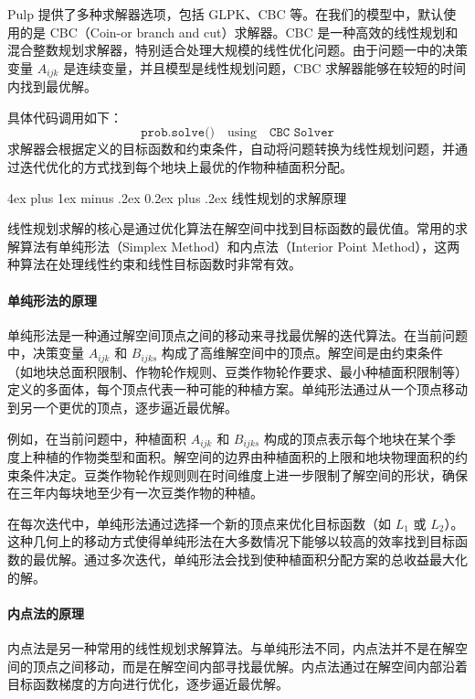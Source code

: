 \documentclass[12pt,a4paper]{nmmcm}
\makeatletter
\renewcommand\subsubsection{\@startsection{subsubsection}{3}{1em}%
  {4ex plus 1ex minus .2ex}%
  {0.2ex plus .2ex}%
  {\normalfont\large\bfseries}}
\makeatother
\begin{document}
Pulp 提供了多种求解器选项，包括 GLPK、CBC 等。在我们的模型中，默认使用的是 CBC（Coin-or branch and cut）求解器。CBC 是一种高效的线性规划和混合整数规划求解器，特别适合处理大规模的线性优化问题。由于问题一中的决策变量 $A_{ijk}$ 是连续变量，并且模型是线性规划问题，CBC 求解器能够在较短的时间内找到最优解。

具体代码调用如下：
\[
  \texttt{prob.solve()} \quad \text{using} \quad \texttt{CBC Solver}
\]
求解器会根据定义的目标函数和约束条件，自动将问题转换为线性规划问题，并通过迭代优化的方式找到每个地块上最优的作物种植面积分配。

\subsubsection{线性规划的求解原理}

线性规划求解的核心是通过优化算法在解空间中找到目标函数的最优值。常用的求解算法有单纯形法（Simplex Method）和内点法（Interior Point Method），这两种算法在处理线性约束和线性目标函数时非常有效。

\paragraph{单纯形法的原理}

单纯形法是一种通过解空间顶点之间的移动来寻找最优解的迭代算法。在当前问题中，决策变量 $A_{ijk}$ 和 $B_{ijks}$ 构成了高维解空间中的顶点。解空间是由约束条件（如地块总面积限制、作物轮作规则、豆类作物轮作要求、最小种植面积限制等）定义的多面体，每个顶点代表一种可能的种植方案。单纯形法通过从一个顶点移动到另一个更优的顶点，逐步逼近最优解。

例如，在当前问题中，种植面积 $A_{ijk}$ 和 $B_{ijks}$ 构成的顶点表示每个地块在某个季度上种植的作物类型和面积。解空间的边界由种植面积的上限和地块物理面积的约束条件决定。豆类作物轮作规则则在时间维度上进一步限制了解空间的形状，确保在三年内每块地至少有一次豆类作物的种植。

在每次迭代中，单纯形法通过选择一个新的顶点来优化目标函数（如 $L_1$ 或 $L_2$）。这种几何上的移动方式使得单纯形法在大多数情况下能够以较高的效率找到目标函数的最优解。通过多次迭代，单纯形法会找到使种植面积分配方案的总收益最大化的解。

\paragraph{内点法的原理}

内点法是另一种常用的线性规划求解算法。与单纯形法不同，内点法并不是在解空间的顶点之间移动，而是在解空间内部寻找最优解。内点法通过在解空间内部沿着目标函数梯度的方向进行优化，逐步逼近最优解。
\end{document}

